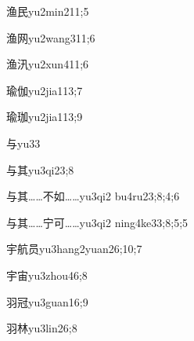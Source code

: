 \begin{verbete}{渔民}{yu2min2}{11;5}
\end{verbete}

\begin{verbete}{渔网}{yu2wang3}{11;6}
\end{verbete}

\begin{verbete}{渔汛}{yu2xun4}{11;6}
\end{verbete}

\begin{verbete}{瑜伽}{yu2jia1}{13;7}
\end{verbete}

\begin{verbete}{瑜珈}{yu2jia1}{13;9}
\end{verbete}

\begin{verbete}{与}{yu3}{3}
\end{verbete}

\begin{verbete}{与其}{yu3qi2}{3;8}
\end{verbete}

\begin{verbete}{与其……不如……}{yu3qi2 bu4ru2}{3;8;4;6}
\end{verbete}

\begin{verbete}{与其……宁可……}{yu3qi2 ning4ke3}{3;8;5;5}
\end{verbete}

\begin{verbete}{宇航员}{yu3hang2yuan2}{6;10;7}
\end{verbete}

\begin{verbete}{宇宙}{yu3zhou4}{6;8}
\end{verbete}

\begin{verbete}{羽冠}{yu3guan1}{6;9}
\end{verbete}

\begin{verbete}{羽林}{yu3lin2}{6;8}
\end{verbete}

